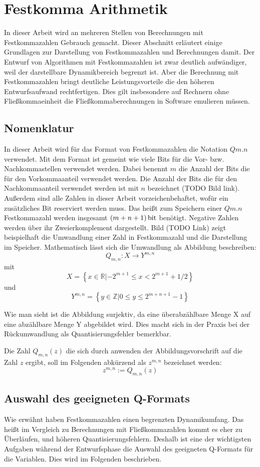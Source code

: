 \chapter{Festkomma Arithmetik}
In dieser Arbeit wird an mehreren Stellen von Berechnungen mit Festkommazahlen Gebrauch gemacht. Dieser Abschnitt erläutert einige Grundlagen zur Darstellung von Festkommazahlen und Berechnungen damit. Der Entwurf von Algorithmen mit Festkommazahlen ist zwar deutlich aufwändiger, weil der darstellbare Dynamikbereich begrenzt ist. Aber die Berechnung mit Festkommazahlen bringt deutliche Leistungsvorteile die den höheren Entwurfsaufwand rechtfertigen. Dies gilt insbesondere auf Rechnern ohne Fließkommaeinheit die Fließkommaberechnungen in Software emulieren müssen.


\section{Nomenklatur}

In dieser Arbeit wird für das Format von Festkommazahlen die Notation $Qm.n$ verwendet. Mit dem Format ist gemeint wie viele Bits für die Vor- bzw. Nachkommastellen verwendet werden. Dabei benennt $m$ die Anzahl der Bits die für den Vorkommaanteil verwendet werden. Die Anzahl der Bits die für den Nachkommaanteil verwendet werden ist mit $n$ bezeichnet (TODO Bild link).
Außerdem sind alle Zahlen in dieser Arbeit vorzeichenbehaftet, wofür ein zusätzliches Bit reserviert werden muss. Das heißt zum Speichern einer $Qm.n$ Festkommazahl werden insgesamt $(m+n+1)\,\si{\bit}$ benötigt. Negative Zahlen werden über ihr Zweierkomplement dargestellt. Bild (TODO Link) zeigt beispielhaft die Umwandlung einer Zahl in Festkommazahl und die Darstellung im Speicher.
Mathematisch lässt sich die Umwandlung als Abbildung beschreiben: 
\[Q_{m,n}: X \rightarrow Y^{m,n}\] 
mit \[X =\left\{x \in \mathbb{R}| -2^{m+1}\leq x<2^{m+1}+1/2\right\}\] und \[Y^{m,n} =\left\{y \in \mathbb{Z} | 0 \leq y \leq 2^{m+n+1}-1\right\}\]

Wie man sieht ist die Abbildung surjektiv, da eine überabzählbare Menge X auf eine abzählbare Menge Y abgebildet wird. Dies macht sich in der Praxis bei der Rückumwandlung als Quantisierungsfehler bemerkbar.

Die Zahl $Q_{m,n}(z)$ die sich durch anwenden der Abbildungsvorschrift auf die Zahl $z$ ergibt, soll im Folgenden abkürzend als $z^{m,n}$ bezeichnet werden:
\[z^{m,n}:=Q_{m,n}(z)\]

\section{Auswahl des geeigneten Q-Formats}
Wie erwähnt haben Festkommazahlen einen begrenzten Dynamikumfang. Das heißt im Vergleich zu Berechnungen mit Fließkommazahlen kommt es eher zu Überläufen, und höheren Quantisierungsfehlern. Deshalb ist eine der wichtigsten Aufgaben während der Entwurfsphase die Auswahl des geeigneten Q-Formats für die Variablen. Dies wird im Folgenden beschrieben.




